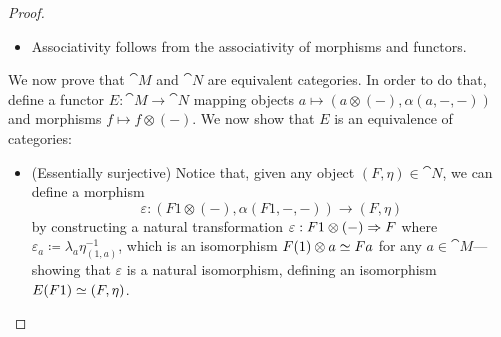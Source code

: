 \documentclass[../../deep-dive]{subfiles}
\begin{document}
\begin{proof}
\begin{itemize}
        \item Associativity follows from the associativity of morphisms and functors.
    \end{itemize}

    We now prove that \(\cat M\) and \(\cat N\) are equivalent categories. In order
    to do that, define a functor \(E: \cat M \to \cat N\) mapping objects
    \(a \mapsto (a \otimes (-), \alpha(a, -, -))\) and morphisms
    \(f \mapsto f \otimes (-)\). We now show that \(E\) is an equivalence of
    categories:
    \begin{itemize}\setlength\itemsep{0em}
        \item (Essentially surjective) Notice that, given any object
              \((F, \eta) \in \cat N\), we can define a morphism
              \[
                  \varepsilon: (F 1 \otimes (-), \alpha(F1, -, -))
                  \longrightarrow (F, \eta)
              \]
              by constructing a natural transformation
              \(\varepsilon: F 1 \otimes (-) \Rightarrow F\) where
              \(\varepsilon_a \coloneq \lambda_{a} \eta_{(1, a)}^{-1}\), which is an
              isomorphism \(F(1) \otimes a \simeq F a\) for any \(a \in \cat M\)---showing
              that \(\varepsilon\) is a natural isomorphism, defining an isomorphism
              \(E(F 1) \simeq (F, \eta)\).


\end{itemize}
\end{proof}
\end{document}
